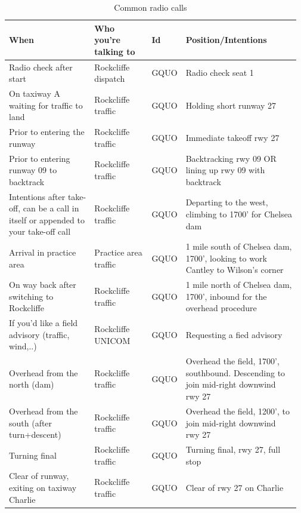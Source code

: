 \documentclass[12pt,letterpaper]{article}
\begin{document}
    \begin{table}[]
        \begin{tabular}{| p{0.30\linewidth} |  p{0.20\linewidth} | p{0.07\linewidth} |  p{0.40\linewidth} |}
        \hline
         When & Who you're talking to & Id & Position/Intentions\\
        \hline
     
        Radio check after start & Rockcliffe dispatch & GQUO & Radio check seat 1\\
        \hline
        
        On taxiway A waiting for traffic to land & Rockcliffe traffic & GQUO & Holding short runway 27\\
        \hline
        
        Prior to entering the runway & Rockcliffe traffic & GQUO & Immediate takeoff rwy 27\\
        \hline
        
        Prior to entering runway 09 to backtrack & Rockcliffe traffic & GQUO & Backtracking rwy 09 OR lining up rwy 09 with backtrack\\
        \hline

        Intentions after take-off, can be a call in itself or appended to your take-off call & Rockcliffe traffic & GQUO & Departing to the west, climbing to 1700’ for Chelsea dam\\
        \hline
        
        Arrival in practice area & Practice area traffic & GQUO & 1 mile south of Chelsea dam, 1700’, looking to work Cantley to Wilson’s corner\\
        \hline
        
        On way back after switching to Rockcliffe & Rockcliffe traffic & GQUO & 1 mile north of Chelsea dam, 1700’, inbound for the overhead procedure\\
        \hline
        
        If you’d like a field advisory (traffic, wind,..) & Rockcliffe UNICOM & GQUO & Requesting a fied advisory\\
        \hline
        
        Overhead from the north (dam) & Rockcliffe traffic & GQUO & Overhead the field, 1700’, southbound. Descending to join mid-right downwind rwy 27\\
        \hline
        
        Overhead from the south (after turn+descent) & Rockcliffe traffic & GQUO & Overhead the field, 1200’, to join mid-right downwind rwy 27\\
        \hline
        
        Turning final & Rockcliffe traffic & GQUO & Turning final, rwy 27, full stop\\
        \hline
        
        Clear of runway, exiting on taxiway Charlie & Rockcliffe traffic & GQUO & Clear of rwy 27 on Charlie\\
        \hline
        
        \end{tabular}
        \caption{Common radio calls}
        \label{tab:radiocalls}
    \end{table}
    
\end{document}
